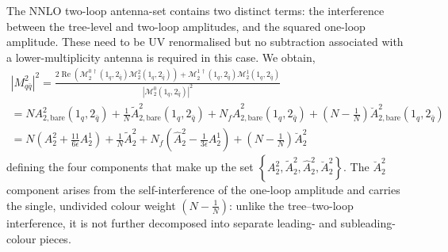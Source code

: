 The NNLO two-loop antenna-set contains two distinct terms: the interference
between the tree-level and two-loop amplitudes, and the squared one-loop
amplitude. These need to be UV renormalised but no subtraction associated
with a lower-multiplicity antenna is required in this case. We obtain,
\begin{equation}\label{eq:a22Amp}
    \begin{gathered}
        |M_{q\bar q}^2|^2 = \frac{2\operatorname{Re}\!\left(\mathcal M_2^{0\,\dagger}(1_q,2_{\bar q})\mathcal M_2^2(1_q,2_{\bar q})\right)+\mathcal M_2^{1\,\dagger}(1_q,2_{\bar q})\mathcal M_2^1(1_q,2_{\bar q})}{|\mathcal M_2^0(1_q,2_{\bar q})|^2}\\
        = NA_{2,\text{bare}}^2(1_q, 2_{\bar q}) + \frac1N \tilde A_{2,\text{bare}}^2(1_q, 2_{\bar q}) + N_f \hat A_{2,\text{bare}}^2(1_q, 2_{\bar q}) + \left(N-\frac1N\right)\breve A_{2,\text{bare}}^2(1_q, 2_{\bar q})\\
        = N\!\left(A_{2}^2+\frac{11}{6\epsilon}A_2^1\right) + \frac1N \tilde A_{2}^2 + N_f\!\left(\hat A_{2}^2-\frac1{3\epsilon}A_2^1\right) + \left(N-\frac1N\right)\breve A_{2}^2
    \end{gathered}
\end{equation}
defining the four components that make up the set
$\left\{A_2^2,\tilde A_2^2,\hat A_2^2,\breve A_2^2\right\}$. The $\breve A_2^2$
component arises from the self-interference of the one-loop amplitude and
carries the single, undivided colour weight $\left(N-\tfrac1N\right)$: unlike
the tree--two-loop interference, it is not further decomposed into separate
leading- and subleading-colour pieces.

